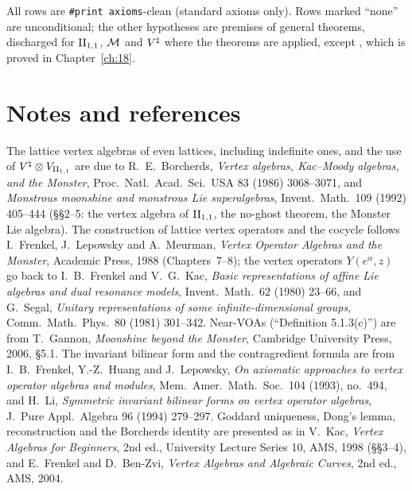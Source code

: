 All rows are \texttt{\#print axioms}-clean (standard axioms only).  Rows marked ``none'' are unconditional; the other
hypotheses are premises of general theorems, discharged for ${\mathrm{II}_{1,1}}$, $\mathcal{M}$ and ${V^{\natural}}$ where the theorems are
applied, except , which is proved in Chapter~\ref{ch:18}.

\section{Notes and references}\label{ch17:sec:notes}

The lattice vertex algebras of even lattices, including indefinite ones, and the use of ${V^{\natural}}\otimes V_{{\mathrm{II}_{1,1}}}$ are due
to R.~E.~Borcherds, \emph{Vertex algebras, Kac--Moody algebras, and the Monster}, Proc.\ Natl.\ Acad.\ Sci.\ USA 83 (1986)
3068--3071, and \emph{Monstrous moonshine and monstrous Lie superalgebras}, Invent.\ Math.\ 109 (1992) 405--444 (\S\S2--5:
the vertex algebra of ${\mathrm{II}_{1,1}}$, the no-ghost theorem, the Monster Lie algebra).  The construction of lattice vertex
operators and the cocycle follows I.~Frenkel, J.~Lepowsky and A.~Meurman, \emph{Vertex Operator Algebras and the Monster},
Academic Press, 1988 (Chapters~7--8); the vertex operators $Y(e^\alpha,z)$ go back to I.~B.~Frenkel and V.~G.~Kac, \emph{Basic
representations of affine Lie algebras and dual resonance models}, Invent.\ Math.\ 62 (1980) 23--66, and G.~Segal, \emph{Unitary
representations of some infinite-dimensional groups}, Comm.\ Math.\ Phys.\ 80 (1981) 301--342.  Near-VOAs (``Definition
5.1.3(c)'') are from T.~Gannon, \emph{Moonshine beyond the Monster}, Cambridge University Press, 2006, \S5.1.  The invariant
bilinear form and the contragredient formula are from I.~B.~Frenkel, Y.-Z.~Huang and J.~Lepowsky, \emph{On axiomatic
approaches to vertex operator algebras and modules}, Mem.\ Amer.\ Math.\ Soc.\ 104 (1993), no.~494, and H.~Li, \emph{Symmetric
invariant bilinear forms on vertex operator algebras}, J.\ Pure Appl.\ Algebra 96 (1994) 279--297.  Goddard uniqueness,
Dong's lemma, reconstruction and the Borcherds identity are presented as in V.~Kac, \emph{Vertex Algebras for Beginners},
2nd ed., University Lecture Series 10, AMS, 1998 (\S\S3--4), and E.~Frenkel and D.~Ben-Zvi, \emph{Vertex Algebras and Algebraic
Curves}, 2nd ed., AMS, 2004.

